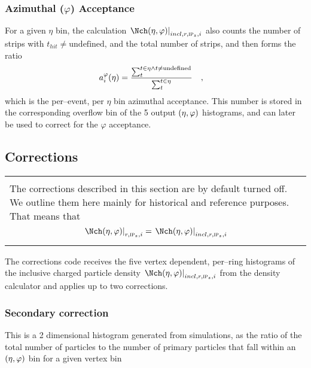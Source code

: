 \subsubsection{Azimuthal ($\varphi$) Acceptance} 

For a given $\eta$ bin, the calculation
$\dndetadphi[incl,r,\subIPz,i]$ also counts the number of strips with
$t_{hit}\neq\text{undefined}$, and the total number of strips, and then
forms the ratio
\begin{align}
  \label{eq:overflow}
  a_i^{\varphi}(\eta) &= \frac{\sum_t^{t\in\eta \wedge
      t\neq\text{undefined}}}{\sum_t^{t\in\eta}} \quad,
\end{align}
which is the per--event, per $\eta$ bin azimuthal acceptance.  This
number is stored in the corresponding overflow bin of the 5 output
$(\eta,\varphi)$ histograms, and can later be used to correct for the
$\varphi$ acceptance.

\subsection{Corrections}
\label{sec:sub:corrector}

\begin{center}
  \begin{tabular}{|p{.9\linewidth}|}
    \arrayrulecolor{alicepurple}
    \hline
    \cellcolor{alicered!20}\\
    \cellcolor{alicered!20}
    The corrections described in this section are by default turned off.
    We outline them here mainly for historical and reference
    purposes. That means that 
    \begin{equation}
      \dndetadphi[r,\subIPz,i] = \dndetadphi[incl,r,\subIPz,i]
    \end{equation}\\
    \hline
  \end{tabular}
\end{center}

The corrections code receives the five vertex dependent,
per--ring histograms of the inclusive charged particle density
$\dndetadphi[incl,r,\subIPz,i]$ from the density calculator and applies
up to two corrections.   

\subsubsection{Secondary correction}
\label{sec:sub:sub:secmap}
This is a 2 dimensional histogram generated from simulations, as the
ratio of the total number of particles to the number of primary
particles that fall within an $(\eta,\varphi)$ bin for a given vertex bin

